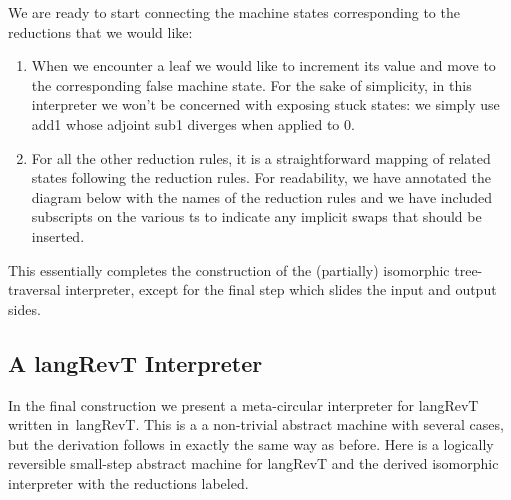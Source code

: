 \documentclass{llncs}
\begin{document}
We are ready to start connecting the machine states corresponding to
the reductions that we would like:
\begin{enumerate}
\item When we encounter a leaf we would like to increment its value and move
  to the corresponding {{false}} machine state. For the sake of simplicity, in
  this interpreter we won't be concerned with exposing stuck states: we
  simply use {{add1}} whose adjoint {{sub1}} diverges when applied to {{0}}.

\item For all the other reduction rules, it is a straightforward mapping of
  related states following the reduction rules. For readability, we have
  annotated the diagram below with the names of the reduction rules and we
  have included subscripts on the various {{t}}s to indicate any implicit
  swaps that should be inserted.

\end{enumerate}


\begin{center}
\end{center}

This essentially completes the construction of the (partially) isomorphic
tree-traversal interpreter, except for the final step which slides the input
and output sides. 

\subsection{A {{langRevT}} Interpreter}
\label{sec:langrevt-int}

In the final construction we present a meta-circular interpreter for
{{langRevT}} written in~{{langRevT}}. This is a a non-trivial abstract
machine with several cases, but the derivation follows in exactly the same
way as before. Here is a logically reversible small-step abstract machine for
{{langRevT}} and the derived isomorphic interpreter with the reductions
labeled.
\end{document}
